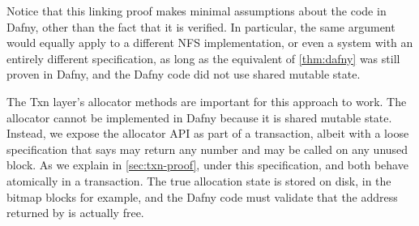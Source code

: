 Notice that this linking proof makes minimal assumptions about the code in
Dafny, other than the fact that it is verified. In particular, the same argument
would equally apply to a different NFS implementation, or even a system with an
entirely different specification, as long as the equivalent of
\autoref{thm:dafny} was still proven in Dafny, and the Dafny code did not use
shared mutable state.


The Txn layer's allocator methods are important for this approach to work.
The allocator cannot be implemented in Dafny because it is shared mutable state.
Instead, we expose the allocator API as part of a transaction, albeit with a loose
specification that says  may return
any number and  may be called on any unused block.
As we explain in \autoref{sec:txn-proof}, under this specification,  and  both behave
atomically in a transaction. The
true allocation state is stored on disk, in the bitmap blocks for
example, and the Dafny code must validate that the address returned by  is actually
free.

